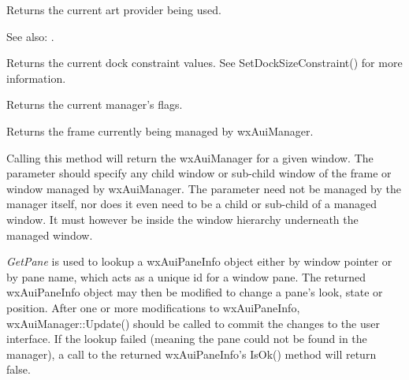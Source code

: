
Returns the current art provider being used.

See also: .


Returns the current dock constraint values.  See SetDockSizeConstraint() for more information.

\label{wxauimanagergetflags}


Returns the current manager's flags.

\label{wxauimanagergetmanagedwindow}


Returns the frame currently being managed by wxAuiManager.


Calling this method will return the wxAuiManager for a given window.  The  parameter should
specify any child window or sub-child window of the frame or window managed by wxAuiManager.
The  parameter need not be managed by the manager itself, nor does it even need to be a child
or sub-child of a managed window.  It must however be inside the window hierarchy underneath the managed
window.

\label{wxauimanagergetpane}



{\it GetPane} is used to lookup a wxAuiPaneInfo object
either by window pointer or by pane name, which acts as a unique id for
a window pane. The returned wxAuiPaneInfo object may then be modified to
change a pane's look, state or position. After one or more
modifications to wxAuiPaneInfo, wxAuiManager::Update() should be called
to commit the changes to the user interface. If the lookup failed
(meaning the pane could not be found in the manager), a call to the
returned wxAuiPaneInfo's IsOk() method will return false.

\label{wxauimanagerhidehint}

